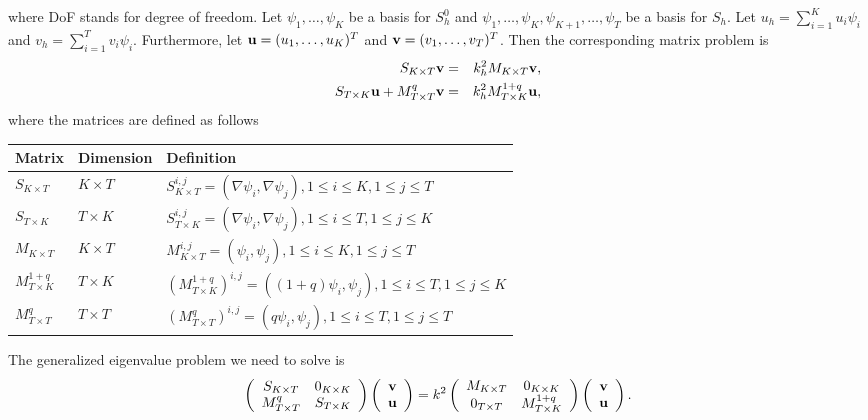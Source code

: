 \documentclass[12pt]{article}%
\numberwithin{equation}{section}
\numberwithin{remark}{section}
\numberwithin{example}{section}
\begin{document}
where DoF stands for degree of freedom.
Let $\psi_1, \ldots, \psi_K$ be a basis for $S_h^0$ and $\psi_1, \ldots, \psi_K, \psi_{K+1}, \ldots, \psi_T$
be a basis for $S_h$.
Let $u_h = \sum_{i=1}^K u_i \psi_i$ and $v_h =  \sum_{i=1}^T v_i \psi_i$. Furthermore, let
${\bf u} = (u_1, \ldots, u_K)^T$  and ${\bf v} = (v_1, \ldots, v_T)^T$.
Then the corresponding matrix problem is
\begin{eqnarray*}
S_{K \times T} {\bf v} & = & k_h^2 M_{K \times T} {\bf v},\\
S_{T \times K}{\bf u} + M_{T \times T}^q {\bf v} &=& k_h^2 M_{T\times K}^{1+q} {\bf u},
\end{eqnarray*}
where the matrices are defined as follows
\begin{center}
\begin{tabular}{||l|l|l||}
\hline\hline
Matrix& Dimension & Definition\\\hline\hline
$S_{K \times T}$ & $K \times T $& $S_{K \times T}^{i,j} = (\nabla \psi_i, \nabla \psi_j), 1 \le i \le K, 1\le j \le T$\\
$S_{T \times K}$ & $T \times K$& $S_{T \times K}^{i,j} = (\nabla \psi_i, \nabla \psi_j), 1 \le i \le T, 1\le j \le K$\\
$M_{K \times T}$&$K \times T $&$M_{K \times T}^{i,j} = (\psi_i, \psi_j), 1 \le i \le K, 1\le j \le T$\\
$M_{T \times K}^{1+q}$&$T \times K$&$(M_{T \times K}^{1+q})^{i,j} = ((1+q)\psi_i, \psi_j), 1 \le i \le T, 1\le j \le K$\\
$M_{T \times T}^{q}$&$T \times T $&$(M_{T \times T}^{q})^{i,j} = (q\psi_i, \psi_j), 1 \le i \le T, 1\le j \le T$\\\hline\hline
\end{tabular}
\end{center}
The generalized eigenvalue problem we need to solve is
\[
\left(\begin{array}{cc}
S_{K \times T}&0_{K \times K}\\
M_{T \times T}^q & S_{T \times K} \end{array}\right)
\left(\begin{array}{c}
{\bf v} \\
{\bf u}  \end{array}\right)
= k^2
\left(\begin{array}{cc}
M_{K \times T}&0_{K \times K}\\
0_{T \times T} & M_{T \times K}^{1+q} \end{array}\right)
\left(\begin{array}{c}
{\bf v} \\
{\bf u}  \end{array}\right).
\]
\end{document}
